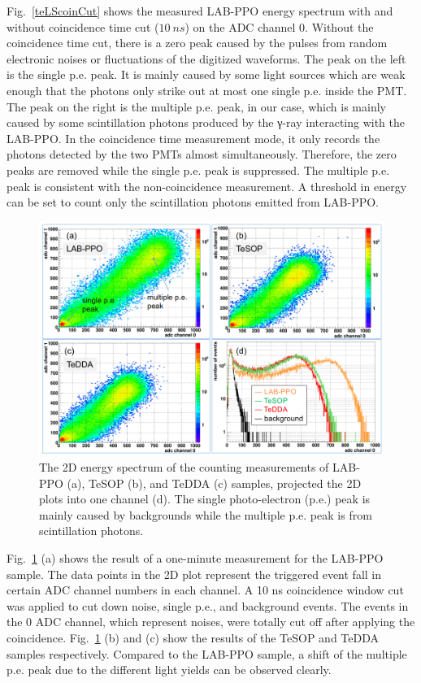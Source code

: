 Fig.~\ref{teLScoinCut} shows the measured LAB-PPO energy spectrum with and without coincidence time cut ($10~ns$) on the ADC channel 0.  Without the coincidence time cut, there is a zero peak caused by the pulses from random electronic noises or fluctuations of the digitized waveforms. The peak on the left is the single p.e. peak. It is mainly caused by some light sources which are weak enough that the photons only strike out at most one single p.e. inside the PMT\cite{leo2012techniques}.  The peak on the right is the multiple p.e. peak, in our case, which is mainly caused by some scintillation photons produced by the γ-ray interacting with the LAB-PPO. In the coincidence time measurement mode, it only records the photons detected by the two PMTs almost simultaneously. Therefore, the zero peaks are removed while the single p.e. peak is suppressed. The multiple p.e. peak is consistent with the non-coincidence measurement. A threshold in energy can be set to count only the scintillation photons emitted from LAB-PPO. 

\begin{figure}[htbp]
	\centering	
	\includegraphics[width=14cm]{TeLS_2Denergy.png}
	\caption[The 2D energy spectrum of the counting measurements.]{The 2D energy spectrum of the counting measurements of LAB-PPO (a), TeSOP (b), and TeDDA (c) samples, projected the 2D plots into one channel (d). The single photo-electron (p.e.) peak is mainly caused by backgrounds while the multiple p.e. peak is from scintillation photons.}
	\label{teLSresults}
\end{figure}

Fig.~\ref{teLSresults} (a) shows the result of a one-minute measurement for the LAB-PPO sample. The data points in the 2D plot represent the triggered event fall in certain ADC channel numbers in each channel. A 10 ns coincidence window cut was applied to cut down noise, single p.e., and background events. The events in the 0 ADC channel, which represent noises, were totally cut off after applying the coincidence. Fig.~\ref{teLSresults} (b) and (c) show the results of the TeSOP and TeDDA samples respectively. Compared to the LAB-PPO sample, a shift of the multiple p.e. peak due to the different light yields can be observed clearly.

